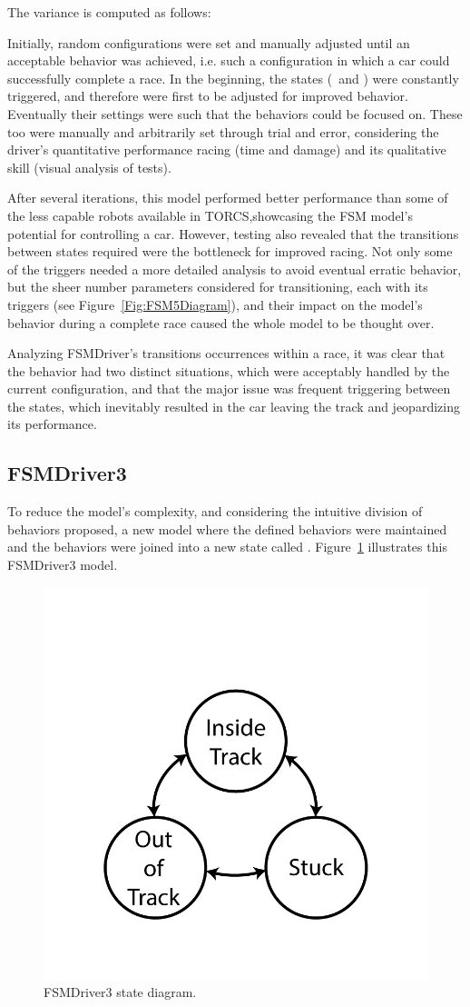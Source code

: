 The variance is computed as follows: 

Initially, random configurations were set and manually adjusted until an acceptable behavior was achieved, i.e. such a configuration in which a car could successfully complete a race. In the beginning, the  states (\OT~and \St) were constantly triggered, and therefore were first to be adjusted for improved behavior. Eventually their settings were such that the  behaviors could be focused on. These too were manually and arbitrarily set through trial and error, considering the driver's quantitative performance racing (time and damage) and its qualitative skill (visual analysis of tests).

After several iterations, this model performed better performance than some of the less capable robots available in TORCS,showcasing the FSM model's potential for controlling a car. However, testing also revealed that the transitions between states required were the bottleneck for improved racing. Not only some of the triggers needed a more detailed analysis to avoid eventual erratic behavior, but the sheer number parameters considered for transitioning, each with its triggers (see Figure~\ref{Fig:FSM5Diagram}), and their impact on the model's behavior during a complete race caused the whole model to be thought over.

Analyzing FSMDriver's transitions occurrences within a race, it was clear that the  behavior had two distinct situations, which were acceptably handled by the current configuration, and that the major issue was frequent triggering between the  states, which inevitably resulted in the car leaving the track and jeopardizing its performance.

\subsection{FSMDriver3}%
To reduce the model's complexity, and considering the intuitive division of behaviors proposed, a new model where the defined  behaviors were maintained and the  behaviors were joined into a new state called \IT. Figure~\ref{Fig:FSM3Diagram} illustrates this FSMDriver3 model.

\begin{figure}[h]
	\centering
	\includegraphics[width=.4\textwidth]{img/ThreeStateFSM}
	\caption{FSMDriver3 state diagram.}
	\label{Fig:FSM3Diagram}
\end{figure}

